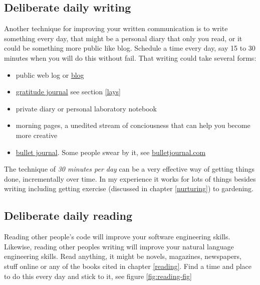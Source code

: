 \documentclass[
]{book}
\providecommand{\tightlist}{%
  \setlength{\itemsep}{0pt}\setlength{\parskip}{0pt}}
\begin{document}
\hypertarget{dailywrite}{%
\subsection{Deliberate daily writing}\label{dailywrite}}

Another technique for improving your written communication is to write something every day, that might be a personal diary that only you read, or it could be something more public like blog. Schedule a time every day, say 15 to 30 minutes when you will do this without fail. That writing could take several forms:

\begin{itemize}
\tightlist
\item
  public web log or \href{https://en.wikipedia.org/wiki/Blog}{blog}
\item
  \href{https://en.wikipedia.org/wiki/Gratitude_journal}{gratitude journal} see section \ref{lays}
\item
  private diary or personal laboratory notebook
\item
  morning pages, a unedited stream of conciousness that can help you become more creative \citep{cameron, burkeman}
\item
  \href{https://en.wikipedia.org/wiki/Bullet_journal}{bullet journal}. Some people swear by it, see \href{https://bulletjournal.com/}{bulletjournal.com}
\end{itemize}

The technique of \emph{30 minutes per day} can be a very effective way of getting things done, incrementally over time. In my experience it works for lots of things besides writing including getting exercise (discussed in chapter \ref{nurturing}) to gardening. \citep{leendertz}

\hypertarget{dailyread}{%
\subsection{Deliberate daily reading}\label{dailyread}}

Reading other people's code will improve your software engineering skills. Likewise, reading other peoples writing will improve your natural language engineering skills. Read anything, it might be novels, magazines, newspapers, stuff online or any of the books cited in chapter \ref{reading}. Find a time and place to do this every day and stick to it, see figure \ref{fig:reading-fig}
\end{document}
